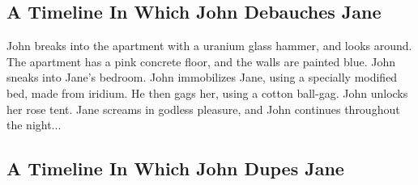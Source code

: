 \documentclass{article}
\begin{document}
\subsection{A Timeline In Which John Debauches Jane}


John breaks into the apartment with a uranium glass hammer, and looks around.
The apartment has a pink concrete floor, and the walls are painted blue.
John sneaks into Jane's bedroom.
John immobilizes Jane, using a specially modified bed, made from iridium.
He then gags her, using a cotton ball{-}gag.
John unlocks her rose tent.
Jane screams in godless pleasure, and John continues throughout the night...
\subsection{A Timeline In Which John Dupes Jane}
\end{document}
